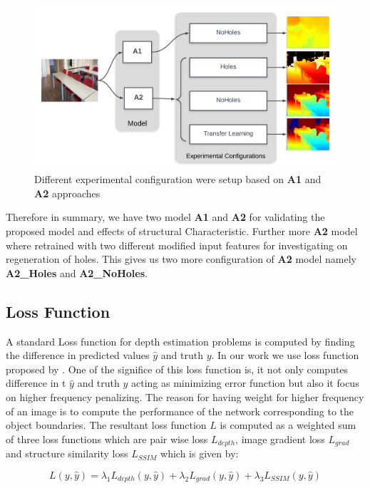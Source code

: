 \begin{figure}[h]
    \centering
    \includegraphics[width = 14cm]{Figures/config_setup.png}
    \caption{Different experimental configuration were setup based on \textbf{A1} and \textbf{A2} approaches}
    \label{fig:Experimental_Setup}
\end{figure}{}



Therefore in summary, we have two model \textbf{A1} and \textbf{A2} for validating the proposed model and effects of structural Characteristic. Further more \textbf{A2} model where retrained with two different modified input features for investigating on regeneration of holes. This gives us two more configuration of \textbf{A2} model namely \textbf{A2\_Holes} and \textbf{A2\_NoHoles}. 

\subsection{Loss Function}
\label{Chapter5:LossFunction}
A standard Loss function for depth estimation problems is computed by finding the difference in predicted values \(\hat{y}\) and truth \(y\). In our work we use loss function proposed by \cite{Alhashim2018}. One of the significe of this loss function is, it not only computes difference in t \(\hat{y}\) and truth \(y\) acting as minimizing error function but also it focus on higher frequency penalizing. The reason for having weight for higher frequency of an image is to compute the performance of the network corresponding to the object boundaries. The resultant loss function \(L\) is computed as a weighted sum of three loss functions which are pair wise loss \(L_{depth}\), image gradient loss \(L_{grad}\) and structure similarity loss  \(L_{SSIM}\) which is given by:


\begin{equation} \label{eq:loss}
       L(y, \hat{y}) = \lambda_{1} L_{depth}(y, \hat{y}) + \lambda_{2} L_{grad}(y, \hat{y}) + \lambda_{3} L_{SSIM}(y, \hat{y})
\end{equation}




